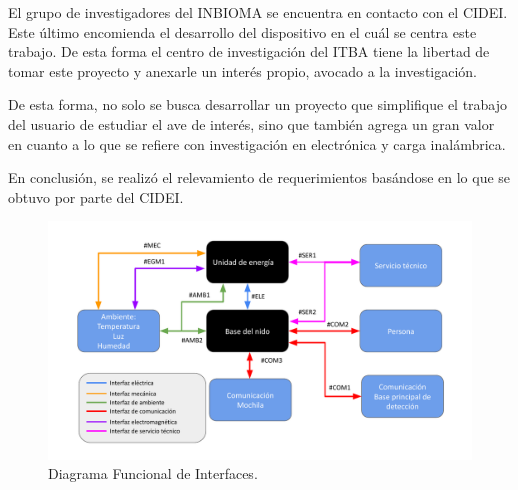\label{sec:RequerimientosCliente}

El grupo de investigadores del INBIOMA se encuentra en contacto con el CIDEI. Este último encomienda el desarrollo del dispositivo en el cuál se centra este trabajo. De esta forma el centro de investigación del ITBA tiene la libertad de tomar este proyecto y anexarle un interés propio, avocado a la investigación.

De esta forma, no solo se busca desarrollar un proyecto que simplifique el trabajo del usuario de estudiar el ave de interés, sino que también agrega un gran valor en cuanto a lo que se refiere con investigación en electrónica y carga inalámbrica.

En conclusión, se realizó el relevamiento de requerimientos basándose en lo que se obtuvo por parte del CIDEI.



\label{sec:DiagramaInterfaces}
\begin{figure}[H]
	\centering
	\includegraphics[width=\linewidth,page=1]{ImagenesDefinicion/func2}
	\caption{Diagrama Funcional de Interfaces.}
	\label{fig:diagrama_func_interfaces}
\end{figure}

\label{sec:EspecificacionesDiseño}

